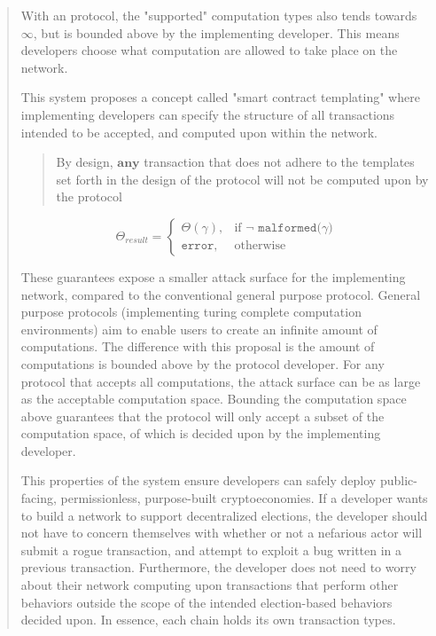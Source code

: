 \documentclass[12pt, titlepage, twocolumn]{report}
\begin{document}
\begin{quotation}
With an \texttt{} protocol, the "supported" computation types also tends towards \(\infty\), but is bounded above by the implementing developer. This means developers choose what computation are allowed to take place on the network.

This system proposes a concept called "smart contract templating" where implementing developers can specify the structure of all transactions intended to be accepted, and computed upon within the network. 

\begin{quotation}
  By design, \(\boldsymbol{any}\) transaction that does not adhere to the templates set forth in the design of the protocol will not be computed upon by the protocol
 \end{quotation}
 
\begin{equation}
	 \Theta_{result} = 
	\begin{cases}
    	 \Theta(\gamma),	& \text{if } \neg \texttt{ malformed(\(\gamma\))}  \\
    	\texttt{error},    & \text{otherwise}
	\end{cases}
\end{equation}

These guarantees expose a smaller attack surface for the implementing network, compared to the conventional general purpose protocol. General purpose protocols (implementing turing complete computation environments) aim to enable users to create an infinite amount of computations. The difference with this proposal is the amount of computations is bounded above by the protocol developer. For any protocol that accepts all computations, the attack surface can be as large as the acceptable computation space. Bounding the computation space above guarantees that the protocol will only accept a subset of the computation space, of which is decided upon by the implementing developer.

This properties of the system ensure developers can safely deploy public-facing, permissionless, purpose-built cryptoeconomies. If a developer wants to build a network to support decentralized elections, the developer should not have to concern themselves with whether or not a nefarious actor will submit a rogue transaction, and attempt to exploit a bug written in a previous transaction. Furthermore, the developer does not need to worry about their network computing upon transactions that perform other behaviors outside the scope of the intended election-based behaviors decided upon. In essence, each chain holds its own transaction types.


\end{quotation}
\end{document}
